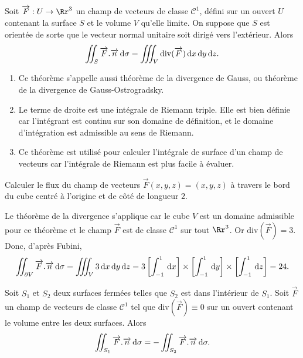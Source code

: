 \documentclass[class=report,crop=false]{standalone}
\begin{document}
\vskip6mm

\begin{theoreme}[\bf Ostrogradsky]Soit $\overrightarrow{F}: U\to \Rr^3$ un champ de vecteurs de classe $\mathscr{C}^1$, défini sur un ouvert $U$ contenant la surface $S$ et le volume $V$ qu'elle limite. On suppose que $S$ est orientée de sorte que le vecteur normal unitaire soit dirigé vers l'extérieur. Alors
$$\int \!\!\!\!\int _S\overrightarrow{F}.\overrightarrow{n}\d \sigma =\int \!\!\!\!\int \!\!\!\!\int _V\mathrm{div}(\overrightarrow{F})\d x\d y\d z.$$
\end{theoreme}

\vskip6mm

\begin{enumerate}
\item Ce théorème s'appelle aussi théorème de la divergence de Gauss, ou théorème de la divergence de Gauss-Ostrogradsky.
\item Le terme de droite est une intégrale de Riemann triple. Elle est bien définie car l'intégrant est continu sur son domaine de définition, et le domaine d'intégration est admissible au sens de Riemann.
\item Ce théorème est utilisé pour calculer l'intégrale de surface d'un champ de vecteurs car l'intégrale de Riemann est plus facile à évaluer.
\end{enumerate}

\vskip6mm

Calculer le flux du champ de vecteurs $\overrightarrow{F}(x,y,z) =(x,y,z)$ à travers le bord du cube centré à l'origine et de c\^oté de longueur $2$.

\vskip3mm

\noindent Le théorème de la divergence s'applique car le cube $V$ est un domaine admissible pour ce théorème et le champ $\overrightarrow{F}$ est de classe $\mathscr{C}^1$ sur tout $\Rr^3$. Or $\mathrm{div}(\overrightarrow{F})=3$. Donc, d'après Fubini,
$$\int \!\!\!\!\int _{\partial V}\overrightarrow{F}.\overrightarrow{n}\d \sigma =\int \!\!\!\!\int \!\!\!\!\int _V3\d x\d y\d z=3\left[\int _{-1}^1\d x\right]\times \left[\int _{-1}^1\d y\right]\times \left[\int _{-1}^1\d z\right]=24.$$

\vskip6mm

\begin{corollaire}Soit $S_1$ et $S_2$ deux surfaces fermées telles que $S_2$ est dans l'intérieur de $S_1$. Soit $\overrightarrow{F}$ un champ de vecteurs de classe $\mathscr{C}^1$ tel que $\mathrm{div}(\overrightarrow{F})\equiv 0$ sur un ouvert contenant le volume entre les deux surfaces. Alors
$$\int \!\!\!\!\int _{S_1}\overrightarrow{F}.\overrightarrow{n}\d \sigma =-\int \!\!\!\!\int _{S_2}\overrightarrow{F}.\overrightarrow{n}\d \sigma .$$
\end{corollaire}
\end{document}
